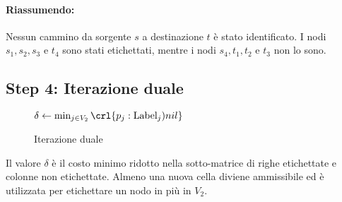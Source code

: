 \documentclass[\main/main.tex]{subfiles}
\begin{document}
\paragraph*{Riassumendo:}
Nessun cammino da sorgente \(s\) a destinazione \(t\) è stato identificato. I nodi \(s_1, s_2, s_3\) e \(t_4\) sono stati etichettati, mentre i nodi \(s_4, t_1, t_2\) e \(t_3\) non lo sono.

\clearpage
\subsection{Step 4: Iterazione duale}
\begin{figure}
	\begin{algorithm}[H]
		\SetAlgoLined
		\(\delta \leftarrow \min_{j \in V_2}\crl{p_j: \text{Label}_j ) nil}\)\;
		\caption{Iterazione duale}
	\end{algorithm}
\end{figure}
Il valore \(\delta \) è il costo minimo ridotto nella sotto-matrice di righe etichettate e colonne non etichettate. Almeno una nuova cella diviene ammissibile ed è utilizzata per etichettare un nodo in più in \(V_2\).
\end{document}
